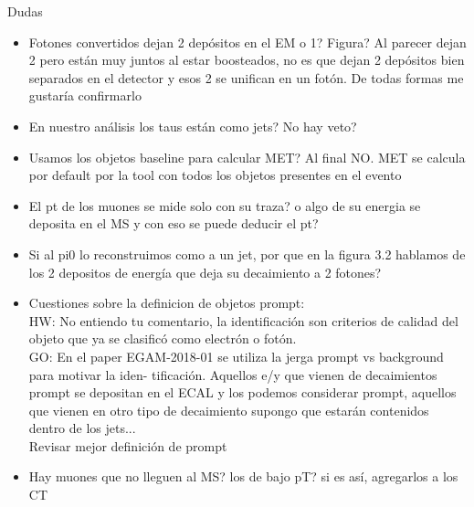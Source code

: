 \newcommand{\commentNotaI}{} \commentNotaI

\newcommand{\commentNotaII}{} \commentNotaII

\newcommand{\commentNotaIII}{} \commentNotaIII

\newcommand{\commentNotaIV}{} \commentNotaIV

\vspace{2cm}


{\LARGE Dudas}

\begin{itemize}
	\item Fotones convertidos dejan 2 depósitos en el EM o 1? Figura? Al parecer dejan 2 pero están muy juntos al estar boosteados, no es que dejan 2 depósitos bien separados en el detector y esos 2 se unifican en un fotón. De todas formas me gustaría confirmarlo
	\item En nuestro análisis los taus están como jets? No hay veto?
	\item Usamos los objetos baseline para calcular MET? Al final NO. MET se calcula por default por la tool con todos los objetos presentes en el evento
	\item El pt de los muones se mide solo con su traza? o algo de su energia se deposita en el MS y con eso se puede deducir el pt?
	\item Si al pi0 lo reconstruimos como a un jet, por que en la figura 3.2 hablamos de los 2 depositos de energía que deja su decaimiento a 2 fotones?
	\item Cuestiones sobre la definicion de objetos prompt: \\
	HW: No entiendo tu comentario, la identificación son criterios de calidad del objeto que ya se clasificó como electrón o fotón. \\
	GO: En	el paper EGAM-2018-01 se utiliza la jerga prompt vs background para motivar la iden-
	tificación. Aquellos e/y que vienen de decaimientos prompt se depositan en el ECAL y
	los podemos considerar prompt, aquellos que vienen en otro tipo de decaimiento supongo
	que estarán contenidos dentro de los jets... \\
	Revisar mejor definición de prompt
	\item Hay muones que no lleguen al MS? los de bajo pT? si es así, agregarlos a los CT
\end{itemize}

